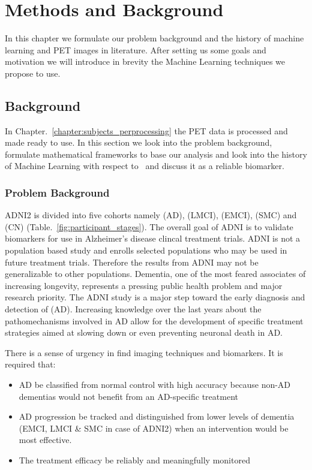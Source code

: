 \chapter{Methods and Background}
In this chapter we formulate our problem background and the history of machine learning and PET images in literature. After setting us some goals and motivation we will introduce in brevity the Machine Learning techniques we propose to use.  

\section{Background}
\label{sec:background}
In Chapter.~\ref{chapter:subjects_perprocessing} the PET data is processed and made ready to use. In this section we look into the problem background, formulate mathematical frameworks to base our analysis and look into the history of Machine Learning with respect to \FDGPET~and discuss it as a reliable biomarker.

\subsection{Problem Background}
ADNI2 is divided into five cohorts namely (AD), (LMCI), (EMCI), (SMC) and (CN) (Table.~\ref{fig:participant_stages}). The overall goal of ADNI is to validate biomarkers for use in Alzheimer’s disease clincal treatment trials. ADNI is not a population based study and enrolls selected populations who may be used in future treatment trials. Therefore the results from ADNI may not be generalizable to other populations. Dementia, one of the most feared associates of increasing longevity, represents a pressing public health problem and major research priority. The ADNI study is a major step toward the early diagnosis and detection of (AD). Increasing knowledge over the last years about the pathomechanisms involved in AD allow for the development of specific treatment strategies aimed at slowing down or even preventing neuronal death in AD.

There is a sense of urgency in find imaging techniques and biomarkers. It is required that:


\begin{itemize}
	\item AD be classified from normal control with high accuracy because non-AD dementias would not benefit from an AD-specific treatment
  	\item AD progression be tracked and distinguished from lower levels of dementia (EMCI, LMCI \& SMC in case of ADNI2) when an intervention would be most effective.
  	\item The treatment efficacy be reliably and meaningfully monitored 
\end{itemize}

